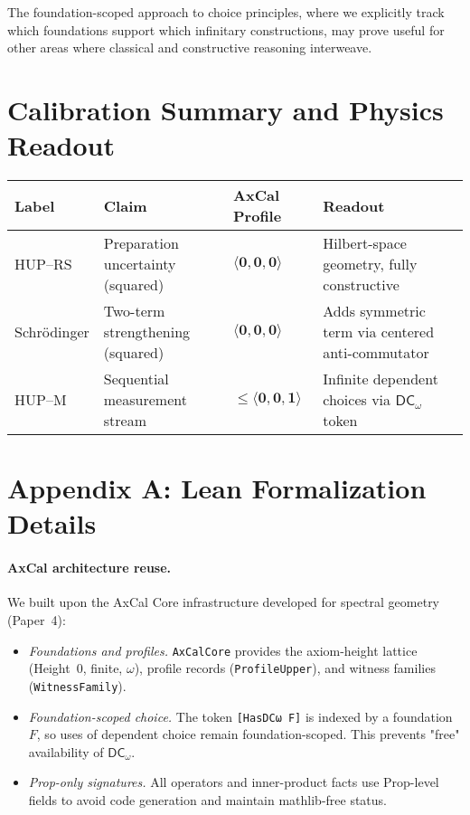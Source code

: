 \documentclass[11pt]{article}
\newcommand{\DCw}{\mathsf{DC}_{\omega}}
\newcommand{\hzero}{\mathbf{0}}
\newcommand{\hone}{\mathbf{1}}
\newcommand{\allzero}{\langle \hzero,\hzero,\hzero\rangle}
\newcommand{\DCwonly}{\langle \hzero,\hzero,\hone\rangle}
\newcommand{\lean}[1]{\texttt{#1}}
\theoremstyle{plain}
\theoremstyle{definition}
\theoremstyle{remark}
\begin{document}
The foundation-scoped approach to choice principles, where we explicitly track which foundations support which infinitary constructions, may prove useful for other areas where classical and constructive reasoning interweave.

\section{Calibration Summary and Physics Readout}

\begin{center}
\begin{tabular}{@{}llll@{}}
\toprule
\textbf{Label} & \textbf{Claim} & \textbf{AxCal Profile} & \textbf{Readout} \\
\midrule
HUP--RS & Preparation uncertainty (squared) & $\allzero$ &
Hilbert-space geometry, fully constructive \\
Schrödinger & Two-term strengthening (squared) & $\allzero$ &
Adds symmetric term via centered anti-commutator \\
HUP--M & Sequential measurement stream & $\le \DCwonly$ &
Infinite dependent choices via $\DCw$ token \\
\bottomrule
\end{tabular}
\end{center}

\section*{Appendix A: Lean Formalization Details}
\label{sec:engineering}

\paragraph{AxCal architecture reuse.}
We built upon the AxCal Core infrastructure developed for spectral geometry (Paper~4):
\begin{itemize}
  \item \emph{Foundations and profiles.} \lean{AxCalCore} provides the axiom-height lattice (Height~0, finite, $\omega$), profile records (\lean{ProfileUpper}), and witness families (\lean{WitnessFamily}).
  \item \emph{Foundation-scoped choice.} The token \lean{[HasDCω F]} is indexed by a foundation $F$, so uses of dependent choice remain foundation-scoped. This prevents "free" availability of $\DCw$.
  \item \emph{Prop-only signatures.} All operators and inner-product facts use Prop-level fields to avoid code generation and maintain mathlib-free status.
\end{itemize}
\end{document}
